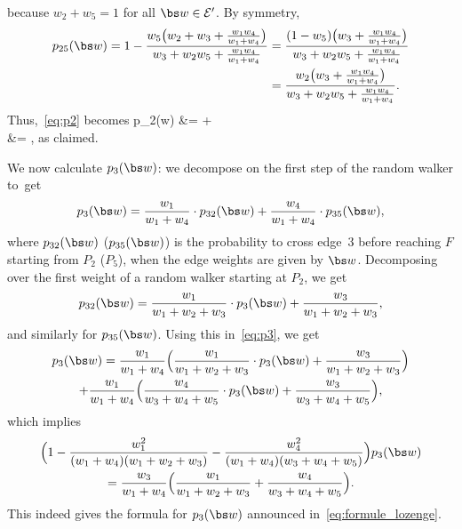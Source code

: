 because $w_2 +w_5=1$ for all $\bs w\in\mathcal E'$.
By symmetry,
\begin{align*}
p_{25}(\bs w)= 1- \frac{w_5\big(w_2+w_3+\frac{w_1w_4}{w_1+w_4}\big)}{w_3+w_2w_5+\frac{w_1w_4}{w_1+w_4}}
&= \frac{(1-w_5)\big(w_3+\frac{w_1w_4}{w_1+w_4}\big)}{w_3+w_2w_5+\frac{w_1w_4}{w_1+w_4}}\\
&= \frac{w_2\big(w_3+\frac{w_1w_4}{w_1+w_4}\big)}{w_3+w_2w_5+\frac{w_1w_4}{w_1+w_4}}.
\end{align*}
Thus,~\eqref{eq:p2} becomes
\ba
p_2(\bs w)
&= \cdot {}
+\cdot{}\\
&= ,
\ea
as claimed.

We now calculate $p_3(\bs w)$: we decompose on the first step of the random walker to~get
\begin{equation}\label{eq:p3}
p_3(\bs w)
= \frac{w_1}{w_1+w_4}\cdot p_{32}(\bs w) + \frac{w_4}{w_1+w_4}\cdot p_{35}(\bs w),
\end{equation}
where $p_{32}(\bs w)$ (\resp $p_{35}(\bs w)$) is the probability to cross edge~$3$ before reaching $F$ starting from $P_2$ (\resp $P_5$), when the edge weights are given by $\bs w$.
Decomposing over the first weight of a random walker starting at $P_2$, we get
\[
p_{32}(\bs w) = \frac{w_1}{w_1+w_2+w_3}\cdot p_3(\bs w) + \frac{w_3}{w_1+w_2+w_3},
\]
and similarly for $p_{35}(\bs w)$.
Using this in~\eqref{eq:p3}, we get
\begin{multline*}
p_3(\bs w)
= \frac{w_1}{w_1+w_4}\Bigl(\frac{w_1}{w_1+w_2+w_3}\cdot p_3(\bs w) + \frac{w_3}{w_1+w_2+w_3} \Bigr)\\
+\frac{w_1}{w_1+w_4} \Bigl(\frac{w_4}{w_3+w_4+w_5}\cdot p_3(\bs w) + \frac{w_3}{w_3+w_4+w_5} \Bigr),
\end{multline*}
which implies
\begin{multline*}
\Bigl(1-\frac{w_1^2}{(w_1+w_4)(w_1+w_2+w_3)}-\frac{w_4^2}{(w_1+w_4)(w_3+w_4+w_5)} \Bigr)p_3(\bs w)\\
= \frac{w_3}{w_1+w_4} \Bigl(\frac{w_1}{w_1+w_2+w_3}+\frac{w_4}{w_3+w_4+w_5} \Bigr).
\end{multline*}
This indeed gives the formula for $p_3(\bs w)$ announced in~\eqref{eq:formule_lozenge}.

